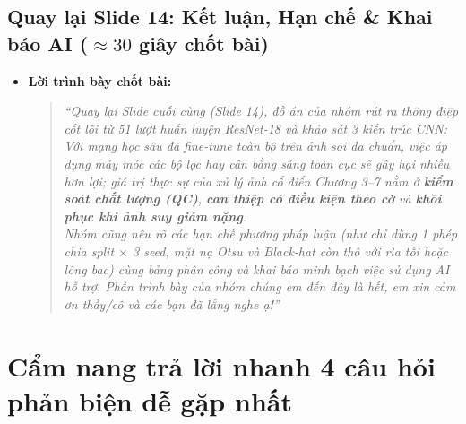 \documentclass[11pt,a4paper]{article}
\begin{document}
\subsection*{Quay lại Slide 14: Kết luận, Hạn chế \& Khai báo AI ($\approx 30$ giây chốt bài)}
\begin{itemize}
    \item \textbf{Lời trình bày chốt bài:}
    \begin{quote}
    \emph{``Quay lại Slide cuối cùng (Slide 14), đồ án của nhóm rút ra thông điệp cốt lõi từ 51 lượt huấn luyện ResNet-18 và khảo sát 3 kiến trúc CNN: Với mạng học sâu đã fine-tune toàn bộ trên ảnh soi da chuẩn, việc áp dụng máy móc các bộ lọc hay cân bằng sáng toàn cục sẽ gây hại nhiều hơn lợi; giá trị thực sự của xử lý ảnh cổ điển Chương 3--7 nằm ở \textbf{kiểm soát chất lượng (QC)}, \textbf{can thiệp có điều kiện theo cờ} và \textbf{khôi phục khi ảnh suy giảm nặng}.\\
    Nhóm cũng nêu rõ các hạn chế phương pháp luận (như chỉ dùng 1 phép chia split $\times$ 3 seed, mặt nạ Otsu và Black-hat còn thô với rìa tối hoặc lông bạc) cùng bảng phân công và khai báo minh bạch việc sử dụng AI hỗ trợ. Phần trình bày của nhóm chúng em đến đây là hết, em xin cảm ơn thầy/cô và các bạn đã lắng nghe ạ!''}
    \end{quote}
\end{itemize}

\section{Cẩm nang trả lời nhanh 4 câu hỏi phản biện dễ gặp nhất}
\end{document}
